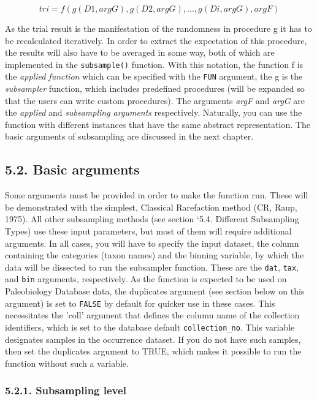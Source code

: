 \documentclass[]{article}
\begin{document}
\[tri = f(g(D1, argG), g(D2, argG),..., g(Di, argG), argF) \]

As the trial result is the manifestation of the randomness in procedure
g it has to be recalculated iteratively. In order to extract the
expectation of this procedure, the results will also have to be averaged
in some way, both of which are implemented in the \texttt{subsample()}
function. With this notation, the function f is the \emph{applied
function} which can be specified with the \texttt{FUN} argument, the g
is the \emph{subsampler} function, which includes predefined procedures
(will be expanded so that the users can write custom procedures). The
arguments \emph{argF} and \emph{argG} are the \emph{applied} and
\emph{subsampling arguments} respectively. Naturally, you can use the
function with different instances that have the same abstract
representation. The basic arguments of subsampling are discussed in the
next chapter.

\subsection{5.2. Basic arguments}\label{basic-arguments}

Some arguments must be provided in order to make the function run. These
will be demonstrated with the simplest, Classical Rarefaction method
(CR, Raup, 1975). All other subsampling methods (see section `5.4.
Different Subsampling Types) use these input parameters, but most of
them will require additional arguments. In all cases, you will have to
specify the input dataset, the column containing the categories (taxon
names) and the binning variable, by which the data will be dissected to
run the subsampler function. These are the \texttt{dat}, \texttt{tax},
and \texttt{bin} arguments, respectively. As the function is expected to
be used on Paleobiology Database data, the duplicates argument (see
section below on this argument) is set to \texttt{FALSE} by default for
quicker use in these cases. This necessitates the 'coll' argument that
defines the column name of the collection identifiers, which is set to
the database default \texttt{collection\_no}. This variable designates
samples in the occurrence dataset. If you do not have such samples, then
set the duplicates argument to TRUE, which makes it possible to run the
function without such a variable.

\subsubsection{5.2.1. Subsampling level}\label{subsampling-level}
\end{document}
